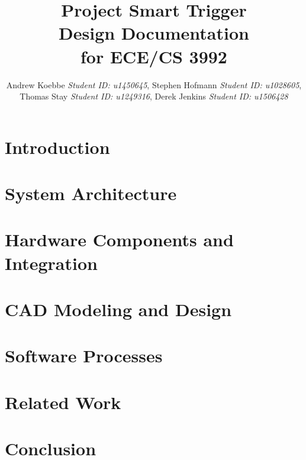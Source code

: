 \documentclass[11pt, journal]{IEEEtran}
\begin{document}
\title{Project Smart Trigger \\ Design Documentation \\ for ECE/CS 3992}

\author{Andrew Koebbe \textit{Student ID: u1450645}, Stephen Hofmann \textit{Student ID: u1028605},\\ Thomas Stay \textit{Student ID: u1249316}, Derek Jenkins \textit{Student ID: u1506428}}%

\maketitle

\begin{abstract}

\end{abstract}

\IEEEpeerreviewmaketitle

\section{Introduction}


\section{System Architecture}


\section{Hardware Components and Integration}


\section{CAD Modeling and Design}


\section{Software Processes}


\section{Related Work}


\section{Conclusion}


\clearpage



\end{document}
